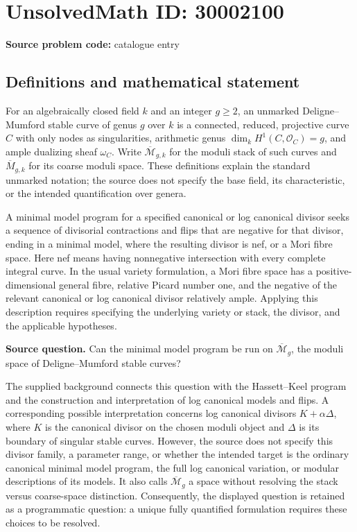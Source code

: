 \documentclass[11pt]{article}
\begin{document}
\section*{UnsolvedMath ID: 30002100}
\textbf{Source problem code:} catalogue entry
\subsection{Definitions and mathematical statement}
For an algebraically closed field \(k\) and an integer \(g\geq 2\), an unmarked Deligne--Mumford stable curve of genus \(g\) over \(k\) is a connected, reduced, projective curve \(C\) with only nodes as singularities, arithmetic genus \(\dim_k H^1(C,\mathcal O_C)=g\), and ample dualizing sheaf \(\omega_C\). Write \(\overline{\mathcal M}_{g,k}\) for the moduli stack of such curves and \(\overline M_{g,k}\) for its coarse moduli space. These definitions explain the standard unmarked notation; the source does not specify the base field, its characteristic, or the intended quantification over genera.

A minimal model program for a specified canonical or log canonical divisor seeks a sequence of divisorial contractions and flips that are negative for that divisor, ending in a minimal model, where the resulting divisor is nef, or a Mori fibre space. Here nef means having nonnegative intersection with every complete integral curve. In the usual variety formulation, a Mori fibre space has a positive-dimensional general fibre, relative Picard number one, and the negative of the relevant canonical or log canonical divisor relatively ample. Applying this description requires specifying the underlying variety or stack, the divisor, and the applicable hypotheses.

\textbf{Source question.} Can the minimal model program be run on \(\overline{\mathcal M}_g\), the moduli space of Deligne--Mumford stable curves?

The supplied background connects this question with the Hassett--Keel program and the construction and interpretation of log canonical models and flips. A corresponding possible interpretation concerns log canonical divisors \(K+\alpha\Delta\), where \(K\) is the canonical divisor on the chosen moduli object and \(\Delta\) is its boundary of singular stable curves. However, the source does not specify this divisor family, a parameter range, or whether the intended target is the ordinary canonical minimal model program, the full log canonical variation, or modular descriptions of its models. It also calls \(\overline{\mathcal M}_g\) a space without resolving the stack versus coarse-space distinction. Consequently, the displayed question is retained as a programmatic question: a unique fully quantified formulation requires these choices to be resolved.
\end{document}
